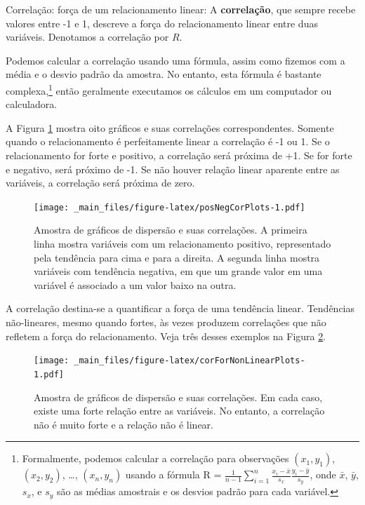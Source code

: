 \documentclass[
]{book}
\theoremstyle{definition}
\theoremstyle{definition}
\theoremstyle{definition}
\theoremstyle{definition}
\theoremstyle{remark}
\begin{document}
Correlação: força de um relacionamento linear: A \textbf{correlação}, que sempre recebe valores entre -1 e 1, descreve a força do relacionamento linear entre duas variáveis. Denotamos a correlação por \(R\).

Podemos calcular a correlação usando uma fórmula, assim como fizemos com a média e o desvio padrão da amostra. No entanto, esta fórmula é bastante complexa,\footnote{Formalmente, podemos calcular a correlação para observações \((x_1, y_1)\), \((x_2, y_2)\), \ldots, \((x_n, y_n)\) usando a fórmula R = \(\frac{1}{n-1}\sum_{i=1}^{n} \frac{x_i-\bar{x}}{s_x}\frac{y_i-\bar{y}}{s_y}\), onde \(\bar{x}\), \(\bar{y}\), \(s_x\), e \(s_y\) são as médias amostrais e os desvios padrão para cada variável.} então geralmente executamos os cálculos em um computador ou calculadora.

A Figura \ref{fig:posNegCorPlots} mostra oito gráficos e suas correlações correspondentes. Somente quando o relacionamento é perfeitamente linear a correlação é -1 ou 1. Se o relacionamento for forte e positivo, a correlação será próxima de +1. Se for forte e negativo, será próximo de -1. Se não houver relação linear aparente entre as variáveis, a correlação será próxima de zero.

\begin{figure}
\centering
\texttt{[image: \_main\_files/figure-latex/posNegCorPlots-1.pdf]}
\caption{\label{fig:posNegCorPlots}Amostra de gráficos de dispersão e suas correlações. A primeira linha mostra variáveis com um relacionamento positivo, representado pela tendência para cima e para a direita. A segunda linha mostra variáveis com tendência negativa, em que um grande valor em uma variável é associado a um valor baixo na outra.}
\end{figure}

A correlação destina-se a quantificar a força de uma tendência linear. Tendências não-lineares, mesmo quando fortes, às vezes produzem correlações que não refletem a força do relacionamento. Veja três desses exemplos na Figura \ref{fig:corForNonLinearPlots}.

\begin{figure}
\centering
\texttt{[image: \_main\_files/figure-latex/corForNonLinearPlots-1.pdf]}
\caption{\label{fig:corForNonLinearPlots}Amostra de gráficos de dispersão e suas correlações. Em cada caso, existe uma forte relação entre as variáveis. No entanto, a correlação não é muito forte e a relação não é linear.}
\end{figure}
\end{document}
